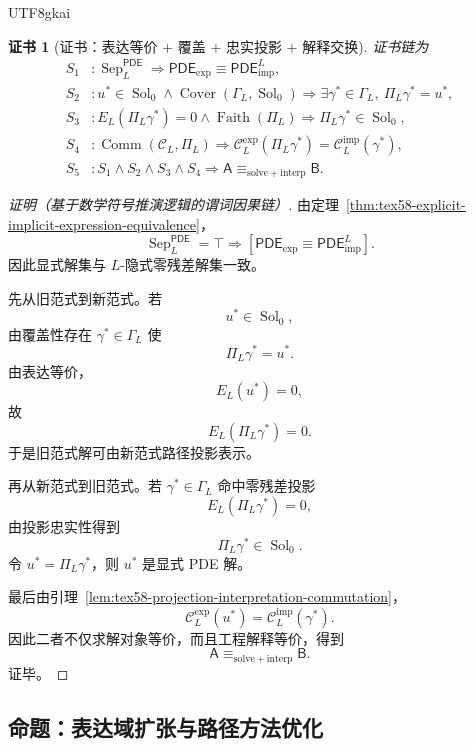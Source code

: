 \documentclass[12pt]{article}
\newtheorem{Certificate}{证书}[section]
\newcommand{\PDE}{\ensuremath{\mathsf{PDE}}}
\DeclareMathOperator{\Sol}{Sol}
\DeclareMathOperator{\Sep}{Sep}
\DeclareMathOperator{\Faith}{Faith}
\DeclareMathOperator{\Cover}{Cover}
\DeclareMathOperator{\Comm}{Comm}
\begin{document}
\begin{CJK*}{UTF8}{gkai}
\begin{Certificate}[证书：表达等价 + 覆盖 + 忠实投影 + 解释交换]
\label{cert:tex58-solve-interpretation-equivalence}
证书链为
\[
\begin{aligned}
  S_1 &: \Sep_L^{\PDE}
  \Rightarrow
  \PDE_{\mathrm{exp}}\equiv\PDE_{\mathrm{imp}}^L,\\
  S_2 &: u^\ast\in\Sol_0
  \wedge
  \Cover(\Gamma_L,\Sol_0)
  \Rightarrow
  \exists\gamma^\ast\in\Gamma_L,\ \Pi_L\gamma^\ast=u^\ast,\\
  S_3 &: E_L(\Pi_L\gamma^\ast)=0
  \wedge
  \Faith(\Pi_L)
  \Rightarrow
  \Pi_L\gamma^\ast\in\Sol_0,\\
  S_4 &: \Comm(\mathcal C_L,\Pi_L)
  \Rightarrow
  \mathcal C_L^{\mathrm{exp}}(\Pi_L\gamma^\ast)
  =
  \mathcal C_L^{\mathrm{imp}}(\gamma^\ast),\\
  S_5 &: S_1\wedge S_2\wedge S_3\wedge S_4
  \Rightarrow
  \mathsf A\equiv_{\mathrm{solve+interp}}\mathsf B.
\end{aligned}
\]
\end{Certificate}

\begin{proof}[证明（基于数学符号推演逻辑的谓词因果链）]
由定理~\ref{thm:tex58-explicit-implicit-expression-equivalence}，
\[
  \Sep_L^{\PDE}=\top
  \Rightarrow
  \left[
  \PDE_{\mathrm{exp}}
  \equiv
  \PDE_{\mathrm{imp}}^L
  \right].
\]
因此显式解集与 \(L\)-隐式零残差解集一致。

先从旧范式到新范式。若
\[
  u^\ast\in\Sol_0,
\]
由覆盖性存在 \(\gamma^\ast\in\Gamma_L\) 使
\[
  \Pi_L\gamma^\ast=u^\ast.
\]
由表达等价，
\[
  E_L(u^\ast)=0,
\]
故
\[
  E_L(\Pi_L\gamma^\ast)=0.
\]
于是旧范式解可由新范式路径投影表示。

再从新范式到旧范式。若 \(\gamma^\ast\in\Gamma_L\) 命中零残差投影
\[
  E_L(\Pi_L\gamma^\ast)=0,
\]
由投影忠实性得到
\[
  \Pi_L\gamma^\ast\in\Sol_0.
\]
令 \(u^\ast=\Pi_L\gamma^\ast\)，则 \(u^\ast\) 是显式 PDE 解。

最后由引理~\ref{lem:tex58-projection-interpretation-commutation}，
\[
  \mathcal C_L^{\mathrm{exp}}(u^\ast)
  =
  \mathcal C_L^{\mathrm{imp}}(\gamma^\ast).
\]
因此二者不仅求解对象等价，而且工程解释等价，得到
\[
  \mathsf A
  \equiv_{\mathrm{solve+interp}}
  \mathsf B.
\]
证毕。
\end{proof}

\subsection{命题：表达域扩张与路径方法优化}
\label{subsec:tex58-expression-method-optimization}


\end{CJK*}
\end{document}
